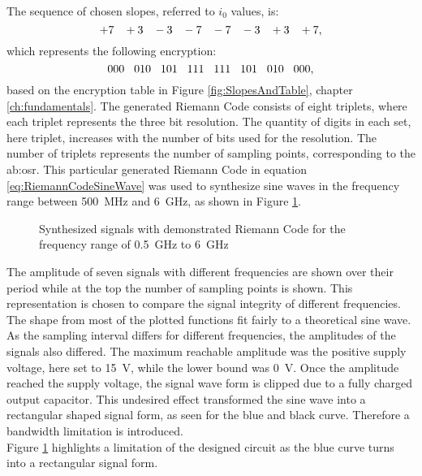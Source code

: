 The sequence of chosen slopes, referred to $i_0$ values, is:
\begin{equation}
 +7\hspace{.3cm} +3\hspace{.3cm} -3\hspace{.3cm} -7\hspace{.3cm} -7\hspace{.3cm} -3\hspace{.3cm} +3\hspace{.3cm} +7,
 \end{equation} 
which represents the following encryption:
\begin{equation}
000\hspace{.3cm} 010\hspace{.3cm} 101\hspace{.3cm} 111\hspace{.3cm} 111\hspace{.3cm} 101\hspace{.3cm} 010\hspace{.3cm} 000,
\end{equation}
\label{eq:RiemannCodeSineWave} 
based on the encryption table in Figure \ref{fig:SlopesAndTable}, chapter \ref{ch:fundamentals}.
The generated Riemann Code consists of eight triplets, where each triplet represents the three bit resolution.
The quantity of digits in each set, here triplet, increases with the number of bits used for the resolution.
The number of triplets represents the number of sampling points, corresponding to the \gls{ab:osr}.
This particular generated Riemann Code in equation \ref{eq:RiemannCodeSineWave} was used to synthesize sine waves in the frequency range between \SI{500}{\MHz} and \SI{6}{\GHz}, as shown in Figure \ref{fig:7SignalsSameSlopeInOnePlot}.

\begin{figure}[htb!]
   \centering 
   
   \caption{Synthesized signals with demonstrated Riemann Code for the frequency range of \SI{0.5}{\GHz} to \SI{6}{\GHz}}
   \label{fig:7SignalsSameSlopeInOnePlot}
\end{figure}

The amplitude of seven signals with different frequencies are shown over their period while at the top the number of sampling points is shown.
This representation is chosen to compare the signal integrity of different frequencies.
The shape from most of the plotted functions fit fairly to a theoretical sine wave.
As the sampling interval differs for different frequencies, the amplitudes of the signals also differed.
The maximum reachable amplitude was the positive supply voltage, here set to \SI{15}{\volt}, while the lower bound was \SI{0}{\volt}. 
Once the amplitude reached the supply voltage, the signal wave form is clipped due to a fully charged output capacitor.
This undesired effect transformed the sine wave into a rectangular shaped signal form, as seen for the blue and black curve.
Therefore a bandwidth limitation is introduced.\\
Figure \ref{fig:7SignalsSameSlopeInOnePlot} highlights a limitation of the designed circuit as the blue curve turns into a rectangular signal form.\\

